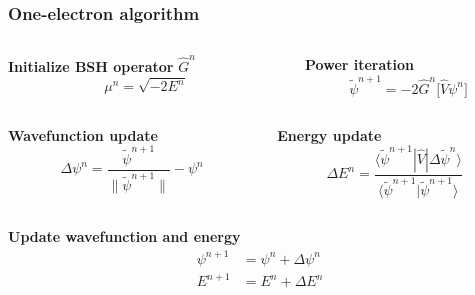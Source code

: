 \begin{frame}
    \frametitle{One-electron algorithm}
    \begin{columns}
    \begin{column}{.50\textwidth}
    \centering
    \textbf{Initialize BSH operator} $\hat{G}^n$
    \begin{equation}
        \nonumber
        \mu^n = \sqrt{-2E^n}
    \end{equation}
    \end{column}

    \begin{column}{.50\textwidth}
    \centering
    \textbf{Power iteration}
    \begin{equation}
	\nonumber
	\tilde{\psi}^{n+1} = -2\hat{G}^n \Big[ \hat{V} \psi^n \Big]
    \end{equation}
    \end{column}
    \end{columns}

    \vspace{5mm}

    \begin{columns}
    \begin{column}{.50\textwidth}
    \centering
    \textbf{Wavefunction update}
    \begin{equation}
	\nonumber
	\Delta\psi^n = \frac{\tilde{\psi}^{n+1}}{\|\tilde{\psi}^{n+1}\|} - \psi^n
    \end{equation}
    \end{column}

    \begin{column}{.50\textwidth}
    \centering
    \textbf{Energy update}
    \begin{equation}
	\nonumber
	\Delta E^n =
        \frac{\langle\tilde{\psi}^{n+1}|\hat{V}|\Delta\tilde{\psi}^n\rangle}
        {\langle\tilde{\psi}^{n+1}|\tilde{\psi}^{n+1}\rangle}
    \end{equation}
    \end{column}
    \end{columns}

    \vspace{10mm}

    \centering
    \textbf{Update wavefunction and energy}
    \begin{align}
	\nonumber
        \psi^{n+1}  &= \psi^n + \Delta \psi^n\\
	\nonumber
        E^{n+1}     &= E^n + \Delta E^n
    \end{align}
\end{frame}

